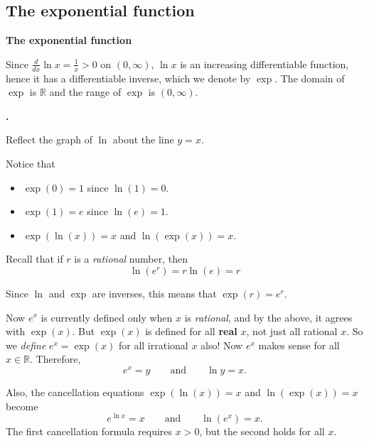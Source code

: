 \documentclass[t]{beamer}
\theoremstyle{plain}
\theoremstyle{definition}
\newcounter{heading}
\newcommand{\makeheading}[1]{\medskip\begin{large}\noindent\textbf{{#1}}\end{large}\smallskip}
\newcommand{\newhead}[1]{\medskip\stepcounter{heading}\noindent\textbf{\hspace{0.2cm}{#1}.}}
\begin{document}
\subsection{The exponential function}

\begin{frame}
\makeheading{The exponential function}

\noindent Since $\frac{d}{dx}\ln x=\frac{1}{x} > 0$ on $(0,\infty)$, $\ln x$ is an increasing differentiable function, hence it has a differentiable inverse, which we denote by $\exp$.  The domain of $\exp$ is $\mathbb{R}$ and the range of $\exp$ is $(0, \infty)$.\pause


\newhead{The graph of $\exp$} 

\noindent Reflect the graph of $\ln$ about the line $y=x$.\pause

\vspace*{.3cm}

\noindent Notice that 
\begin{itemize}[<+->]
\item $\exp(0) = 1$ since $\ln(1) = 0$.
\item $\exp(1) = e$ since $\ln(e) = 1$.
\item $\exp(\ln(x)) = x$ and $\ln(\exp(x)) = x$.
\end{itemize}
\end{frame}

\begin{frame}
\noindent Recall that if $r$ is a \emph{rational} number, then 
\[ \ln(e^{r}) = r\ln(e) = r\]  

\pause

\noindent Since $\ln$ and $\exp$ are inverses, this means that $\exp(r) = e^{r}$.\pause

\medskip

\noindent Now $e^{x}$ is currently defined only when $x$ is \emph{rational}, and by the above, it agrees with $\exp(x)$.  But $\exp(x)$ is defined for all \textbf{real} $x$, not just all rational $x$. \pause So we \emph{define} $e^{x} = \exp(x)$ for all irrational $x$ also!  Now $e^{x}$ makes sense for all $x \in \mathbb{R}$.  Therefore,
\[ e^{x} = y \qquad \text{and} \qquad \ln y = x.\]\pause

\noindent Also, the cancellation equations $\exp(\ln(x)) = x$ and $\ln(\exp(x)) = x$ become
\[ e^{\ln x} = x \qquad \text{and} \qquad \ln(e^{x}) = x.\]
The first cancellation formula requires $x>0$, but the second holds for all $x$.
\end{frame}
\end{document}
